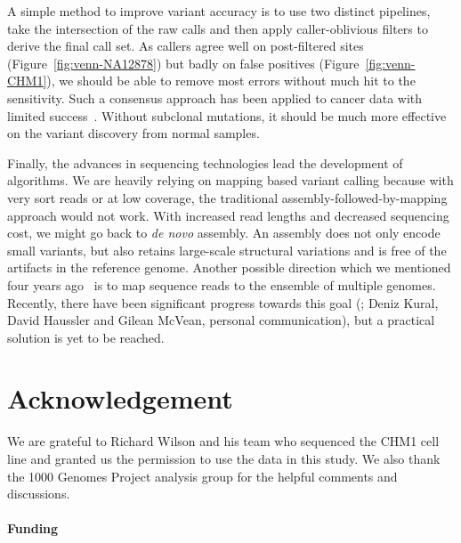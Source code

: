 \documentclass{bioinfo}
\begin{document}
A simple method to improve variant accuracy is to use two distinct pipelines,
take the intersection of the raw calls and then apply caller-oblivious filters
to derive the final call set. As callers agree well on post-filtered sites
(Figure~\ref{fig:venn-NA12878}) but badly on false positives
(Figure~\ref{fig:venn-CHM1}), we should be able to remove most errors without
much hit to the sensitivity. Such a consensus approach has been applied to
cancer data with limited success~\citep{Lower:2012aa,Goode:2013aa}. Without
subclonal mutations, it should be much more effective on the variant discovery
from normal samples.

Finally, the advances in sequencing technologies lead the development of
algorithms. We are heavily relying on mapping based variant calling because
with very sort reads or at low coverage, the traditional
assembly-followed-by-mapping approach would not work. With increased read
lengths and decreased sequencing cost, we might go back to \emph{de novo}
assembly. An assembly does not only encode small variants, but also
retains large-scale structural variations and is free of the artifacts in the
reference genome. Another possible direction which we mentioned four years
ago~\citep{Li:2010kx} is to map sequence reads to the ensemble of 
multiple genomes. Recently, there have been significant progress towards this
goal (; Deniz Kural, David Haussler
and Gilean McVean, personal communication), but a practical solution is yet to
be reached.

\section*{Acknowledgement}
We are grateful to Richard Wilson and his team who sequenced the CHM1 cell line
and granted us the permission to use the data in this study. We also thank the
1000 Genomes Project analysis group for the helpful comments and discussions.

\paragraph{Funding\textcolon}


\end{document}

